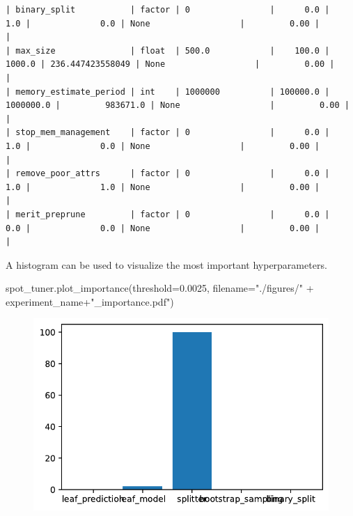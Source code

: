 \documentclass[
  letterpaper,
  DIV=11,
  numbers=noendperiod]{scrreprt}
\newenvironment{Shaded}{\begin{snugshade}}{\end{snugshade}}
\newcommand{\FloatTok}[1]{\textcolor[rgb]{0.68,0.00,0.00}{#1}}
\newcommand{\NormalTok}[1]{\textcolor[rgb]{0.00,0.23,0.31}{#1}}
\newcommand{\OperatorTok}[1]{\textcolor[rgb]{0.37,0.37,0.37}{#1}}
\newcommand{\StringTok}[1]{\textcolor[rgb]{0.13,0.47,0.30}{#1}}
\begin{document}
\begin{verbatim}
| binary_split           | factor | 0                |      0.0 |       1.0 |              0.0 | None                  |         0.00 |         |
| max_size               | float  | 500.0            |    100.0 |    1000.0 | 236.447423558049 | None                  |         0.00 |         |
| memory_estimate_period | int    | 1000000          | 100000.0 | 1000000.0 |         983671.0 | None                  |         0.00 |         |
| stop_mem_management    | factor | 0                |      0.0 |       1.0 |              0.0 | None                  |         0.00 |         |
| remove_poor_attrs      | factor | 0                |      0.0 |       1.0 |              1.0 | None                  |         0.00 |         |
| merit_preprune         | factor | 0                |      0.0 |       0.0 |              0.0 | None                  |         0.00 |         |
\end{verbatim}

A histogram can be used to visualize the most important hyperparameters.

\begin{Shaded}
\begin{Highlighting}[]
\NormalTok{spot\_tuner.plot\_importance(threshold}\OperatorTok{=}\FloatTok{0.0025}\NormalTok{, filename}\OperatorTok{=}\StringTok{"./figures/"} \OperatorTok{+}\NormalTok{ experiment\_name}\OperatorTok{+}\StringTok{"\_importance.pdf"}\NormalTok{)}
\end{Highlighting}
\end{Shaded}

\begin{figure}[H]

{\centering \includegraphics{13_spot_hpt_river_files/figure-pdf/cell-23-output-1.pdf}

}

\end{figure}
\end{document}
